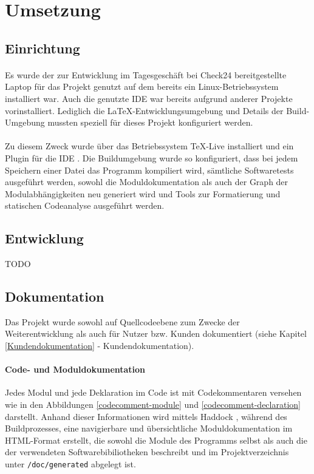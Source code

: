 \section{Umsetzung}

\subsection{Einrichtung}
\paragraph{}
Es wurde der zur Entwicklung im Tagesgeschäft bei Check24 bereitgestellte Laptop
für das Projekt genutzt auf dem bereits ein Linux-Betriebssystem installiert war.
Auch die genutzte \gls{IDE} war bereits aufgrund anderer Projekte vorinstalliert.
Lediglich die \LaTeX-Entwicklungsumgebung und Details der Build-Umgebung mussten
speziell für dieses Projekt konfiguriert werden.

\paragraph{}
Zu diesem Zweck wurde über das Betriebssystem \TeX-Live \cite{texlive} installiert
und ein Plugin für die \gls{IDE} \cite{latex-workshop}. Die Buildumgebung
wurde so konfiguriert, dass bei jedem Speichern einer Datei das Programm kompiliert wird,
sämtliche Softwaretests ausgeführt werden, sowohl die Moduldokumentation als auch
der Graph der Modulabhängigkeiten neu generiert wird und Tools zur Formatierung
und statischen Codeanalyse ausgeführt werden.

\subsection{Entwicklung}
TODO

\subsection{Dokumentation}
Das Projekt wurde sowohl auf Quellcodeebene zum Zwecke der Weiterentwicklung als
auch für Nutzer bzw. Kunden dokumentiert (siehe Kapitel \ref{Kundendokumentation} - Kundendokumentation).

\paragraph{Code- und Moduldokumentation}
Jedes Modul und jede Deklaration im Code ist mit Codekommentaren versehen wie in
den Abbildungen \ref{codecomment-module} und \ref{codecomment-declaration} darstellt.
Anhand dieser Informationen wird mittels Haddock \cite{haddock}, während des Buildprozesses,
eine navigierbare und übersichtliche Moduldokumentation im HTML-Format erstellt,
die sowohl die Module des Programms selbst als auch die der verwendeten Softwarebibiliotheken
beschreibt und im Projektverzeichnis unter \texttt{/doc/generated}
abgelegt ist.

